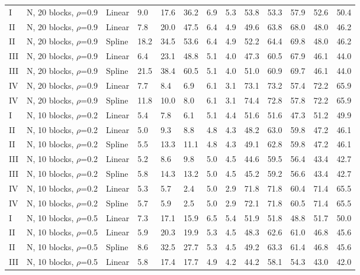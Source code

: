 \documentclass{article}\usepackage[]{graphicx}\usepackage[]{color}
\begin{document}
\begin{table}[ht]
\begin{tabular}{lll|lllll|lllll}
   \hline
I & N, 20 blocks, $\rho$=0.9 & Linear & 9.0 & 17.6 & 36.2 & 6.9 & 5.3 & 53.8 & 53.3 & 57.9 & 52.6 & 50.4 \\ 
  II & N, 20 blocks, $\rho$=0.9 & Linear & 7.8 & 20.0 & 47.5 & 6.4 & 4.9 & 49.6 & 63.8 & 68.0 & 48.0 & 46.2 \\ 
  II & N, 20 blocks, $\rho$=0.9 & Spline & 18.2 & 34.5 & 53.6 & 6.4 & 4.9 & 52.2 & 64.4 & 69.8 & 48.0 & 46.2 \\ 
  III & N, 20 blocks, $\rho$=0.9 & Linear & 6.4 & 23.1 & 48.8 & 5.1 & 4.0 & 47.3 & 60.5 & 67.9 & 46.1 & 44.0 \\ 
  III & N, 20 blocks, $\rho$=0.9 & Spline & 21.5 & 38.4 & 60.5 & 5.1 & 4.0 & 51.0 & 60.9 & 69.7 & 46.1 & 44.0 \\ 
  IV & N, 20 blocks, $\rho$=0.9 & Linear & 7.7 & 8.4 & 6.9 & 6.1 & 3.1 & 73.1 & 73.2 & 57.4 & 72.2 & 65.9 \\ 
  IV & N, 20 blocks, $\rho$=0.9 & Spline & 11.8 & 10.0 & 8.0 & 6.1 & 3.1 & 74.4 & 72.8 & 57.8 & 72.2 & 65.9 \\ 
   \hline
I & N, 10 blocks, $\rho$=0.2 & Linear & 5.4 & 7.8 & 6.1 & 5.1 & 4.4 & 51.6 & 51.6 & 47.3 & 51.2 & 49.9 \\ 
  II & N, 10 blocks, $\rho$=0.2 & Linear & 5.0 & 9.3 & 8.8 & 4.8 & 4.3 & 48.2 & 63.0 & 59.8 & 47.2 & 46.1 \\ 
  II & N, 10 blocks, $\rho$=0.2 & Spline & 5.5 & 13.3 & 11.1 & 4.8 & 4.3 & 49.1 & 62.8 & 59.8 & 47.2 & 46.1 \\ 
  III & N, 10 blocks, $\rho$=0.2 & Linear & 5.2 & 8.6 & 9.8 & 5.0 & 4.5 & 44.6 & 59.5 & 56.4 & 43.4 & 42.7 \\ 
  III & N, 10 blocks, $\rho$=0.2 & Spline & 5.8 & 14.3 & 13.2 & 5.0 & 4.5 & 45.2 & 59.2 & 56.6 & 43.4 & 42.7 \\ 
  IV & N, 10 blocks, $\rho$=0.2 & Linear & 5.3 & 5.7 & 2.4 & 5.0 & 2.9 & 71.8 & 71.8 & 60.4 & 71.4 & 65.5 \\ 
  IV & N, 10 blocks, $\rho$=0.2 & Spline & 5.7 & 5.9 & 2.5 & 5.0 & 2.9 & 72.1 & 71.8 & 60.5 & 71.4 & 65.5 \\ 
   \hline
I & N, 10 blocks, $\rho$=0.5 & Linear & 7.3 & 17.1 & 15.9 & 6.5 & 5.4 & 51.9 & 51.8 & 48.8 & 51.7 & 50.0 \\ 
  II & N, 10 blocks, $\rho$=0.5 & Linear & 5.9 & 20.3 & 19.9 & 5.3 & 4.5 & 48.3 & 62.6 & 61.0 & 46.8 & 45.6 \\ 
  II & N, 10 blocks, $\rho$=0.5 & Spline & 8.6 & 32.5 & 27.7 & 5.3 & 4.5 & 49.2 & 63.3 & 61.4 & 46.8 & 45.6 \\ 
  III & N, 10 blocks, $\rho$=0.5 & Linear & 5.8 & 17.4 & 17.7 & 4.9 & 4.2 & 44.2 & 58.1 & 54.3 & 43.0 & 42.0 \\ 

\end{tabular}
\end{table}
\end{document}
